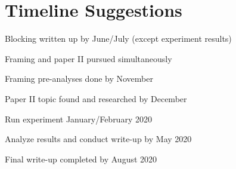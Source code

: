 \section*{Timeline Suggestions}
	\begin{coi}
		\item Blocking written up by June/July (except experiment results)
		\item Framing and paper II pursued simultaneously
		\item Framing pre-analyses done by November
		\item Paper II topic found and researched by December
		\item Run experiment January/February 2020
		\item Analyze results and conduct write-up by May 2020
		\item Final write-up completed by August 2020
	\end{coi}








